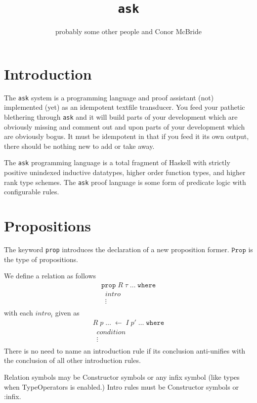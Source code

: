 \documentclass{article}
\newcommand{\ask}{\texttt{ask}}
\newcommand{\prop}{\texttt{prop}}
\newcommand{\Prop}{\texttt{Prop}}
\newcommand{\where}{\texttt{where}}
\newcommand{\by}{\leftarrow}
\begin{document}
\title{\ask}
\author{probably some other people and Conor McBride}
\maketitle


\section{Introduction}

The \ask{} system is a programming language and proof assistant (not) implemented (yet) as an idempotent textfile transducer. You feed your pathetic blethering through \ask{} and it will
build parts of your development which are obviously missing and comment out and upon parts of
your development which are obviously bogus. It must be idempotent in that if you feed it its
own output, there should be nothing new to add or take away.

The \ask{} programming language is a total fragment of Haskell with strictly positive
unindexed inductive datatypes, higher order function types, and higher rank type schemes.
The \ask{} proof language is some form of predicate logic with configurable rules.


\section{Propositions}

The keyword \prop{} introduces the declaration of a new proposition former. $\Prop$ is the
type of propositions.

We define a relation as follows
\[
  \begin{array}{l}
    \prop \; R\; \tau\;\ldots\;\where\\
    \;\;\mathit{intro} \\
    \;\;\vdots\\
  \end{array}
\]
with each $\mathit{intro}_i$ given as
\[
  \begin{array}{l}
    R\;p\;\ldots\;\by\;I\;p'\;\ldots\;\where\\
    \;\;\mathit{condition} \\
    \;\;\vdots\\
  \end{array}
\]
There is no need to name an introduction rule if its conclusion
anti-unifies with the conclusion of all other introduction rules.

Relation symbols may be Constructor symbols or any infix symbol (like
types when TypeOperators is enabled.)
Intro rules must be Constructor symbols or :infix.
\end{document}
